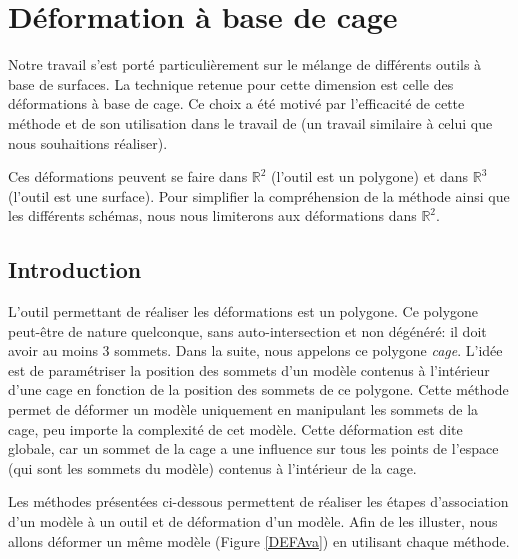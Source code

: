 

\chapter{Déformation à base de cage}

\graphicspath{ {Chapter2/Chapter2Figs/PNG/}
  {Chapter2/Chapter2Figs/PDF/} {Chapter2/Chapter2Figs/} }

Notre travail s'est porté particulièrement sur le mélange de différents outils
à base de surfaces. La technique retenue pour cette dimension est celle
des déformations à base de cage. Ce choix a été motivé par l'efficacité de
cette méthode et de son utilisation dans le travail de \cite{GPCP13} (un
travail similaire à celui que nous souhaitions réaliser).

Ces déformations peuvent se faire dans $\mathbb{R}^2$ (l'outil
est un polygone) et dans $\mathbb{R}^3$ (l'outil est une surface). Pour
simplifier la compréhension de la méthode ainsi que les différents schémas,
nous nous limiterons aux déformations dans $\mathbb{R}^2$.

\section{Introduction} 

L'outil permettant de réaliser les déformations est un polygone. Ce polygone
peut-être de nature quelconque, sans auto-intersection et non dégénéré: il
doit avoir au moins 3 sommets. Dans la suite, nous appelons ce polygone
\textit{cage}. L'idée est de paramétriser la position des sommets d'un modèle
contenus à l'intérieur d'une cage en fonction de la position des sommets de ce
polygone. Cette méthode permet de déformer un modèle uniquement en manipulant
les sommets de la cage, peu importe la complexité de cet modèle. Cette
déformation est dite globale, car un sommet de la cage a une influence sur
tous les points de l'espace (qui sont les sommets du modèle) contenus à
l'intérieur de la cage.

Les méthodes présentées ci-dessous permettent de réaliser les étapes
d'association d'un modèle à un outil et de déformation d'un modèle. Afin de
les illuster, nous allons déformer un même modèle (Figure \ref{DEFAva}) en
utilisant chaque méthode.

